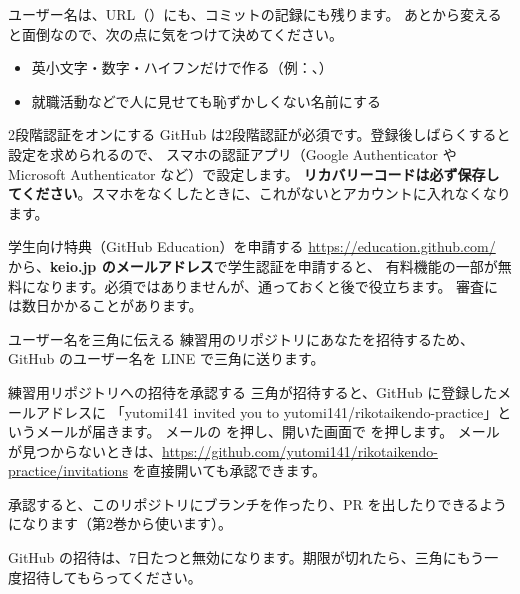\begin{caution}[ユーザー名の決め方]
ユーザー名は、URL（）にも、コミットの記録にも残ります。
あとから変えると面倒なので、次の点に気をつけて決めてください。
\begin{itemize}
  \item 英小文字・数字・ハイフンだけで作る（例：、）
  \item 就職活動などで人に見せても恥ずかしくない名前にする
\end{itemize}
\end{caution}

\begin{step}{2段階認証をオンにする}
GitHub は2段階認証が必須です。登録後しばらくすると設定を求められるので、
スマホの認証アプリ（Google Authenticator や Microsoft Authenticator など）で設定します。
\textbf{リカバリーコードは必ず保存してください}。スマホをなくしたときに、これがないとアカウントに入れなくなります。
\end{step}

\begin{step}{学生向け特典（GitHub Education）を申請する}
\url{https://education.github.com/} から、\textbf{keio.jp のメールアドレス}で学生認証を申請すると、
有料機能の一部が無料になります。必須ではありませんが、通っておくと後で役立ちます。
審査には数日かかることがあります。
\end{step}

\begin{step}{ユーザー名を三角に伝える}
練習用のリポジトリにあなたを招待するため、GitHub のユーザー名を LINE で三角に送ります。
\end{step}

\begin{step}{練習用リポジトリへの招待を承認する}
三角が招待すると、GitHub に登録したメールアドレスに
「yutomi141 invited you to yutomi141/rikotaikendo-practice」というメールが届きます。
メールの  を押し、開いた画面で  を押します。
メールが見つからないときは、\url{https://github.com/yutomi141/rikotaikendo-practice/invitations} を直接開いても承認できます。

承認すると、このリポジトリにブランチを作ったり、PR を出したりできるようになります（第2巻から使います）。
\end{step}

\begin{caution}[招待には期限がある]
GitHub の招待は、7日たつと無効になります。期限が切れたら、三角にもう一度招待してもらってください。
\end{caution}

